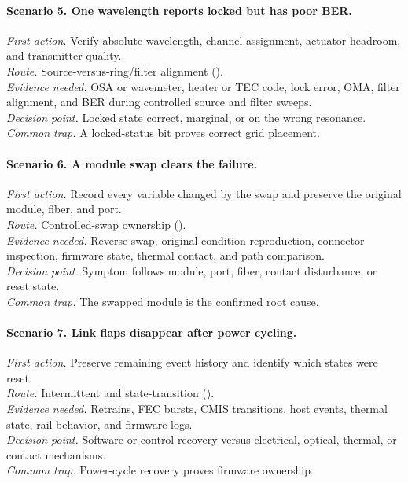 \paragraph{Scenario 5. One wavelength reports locked but has poor BER.}
\textit{First action.} Verify absolute wavelength, channel assignment,
actuator headroom, and transmitter quality.\\
\textit{Route.} Source-versus-ring/filter alignment
().\\
\textit{Evidence needed.} OSA or wavemeter, heater or TEC code, lock error,
OMA, filter alignment, and BER during controlled source and filter sweeps.\\
\textit{Decision point.} Locked state correct, marginal, or on the wrong
resonance.\\
\textit{Common trap.} A locked-status bit proves correct grid placement.

\paragraph{Scenario 6. A module swap clears the failure.}
\textit{First action.} Record every variable changed by the swap and preserve
the original module, fiber, and port.\\
\textit{Route.} Controlled-swap ownership
().\\
\textit{Evidence needed.} Reverse swap, original-condition reproduction,
connector inspection, firmware state, thermal contact, and path comparison.\\
\textit{Decision point.} Symptom follows module, port, fiber, contact
disturbance, or reset state.\\
\textit{Common trap.} The swapped module is the confirmed root cause.

\paragraph{Scenario 7. Link flaps disappear after power cycling.}
\textit{First action.} Preserve remaining event history and identify which
states were reset.\\
\textit{Route.} Intermittent and state-transition
().\\
\textit{Evidence needed.} Retrains, FEC bursts, CMIS transitions, host events,
thermal state, rail behavior, and firmware logs.\\
\textit{Decision point.} Software or control recovery versus electrical,
optical, thermal, or contact mechanisms.\\
\textit{Common trap.} Power-cycle recovery proves firmware ownership.

